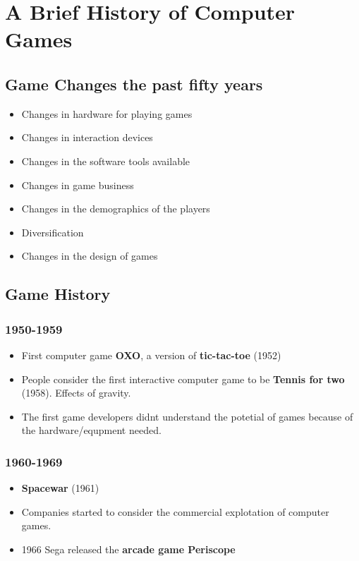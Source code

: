 \chapter*{A Brief History of Computer Games}

  \section*{Game Changes the past fifty years}

  \begin{itemize}
    \item Changes in hardware for playing games
    \item Changes in interaction devices
    \item Changes in the software tools available
    \item Changes in game business
    \item Changes in the demographics of the players
    \item Diversification
    \item Changes in the design of games
  \end{itemize}

  \section*{Game History}

  \subsection*{1950-1959}
    \begin{itemize}
      \item First computer game {\bf OXO}, a version of {\bf tic-tac-toe} (1952)
      \item People consider the first interactive computer game to be {\bf Tennis for two} (1958). Effects of gravity.
      \item The first game developers didnt understand the potetial of games because of the hardware/equpment needed.
    \end{itemize}

  \subsection*{1960-1969}
    \begin{itemize}
      \item {\bf Spacewar} (1961)
      \item Companies started to consider the commercial explotation of computer games.
      \item 1966 Sega released the {\bf arcade game Periscope} 
    \end{itemize}

